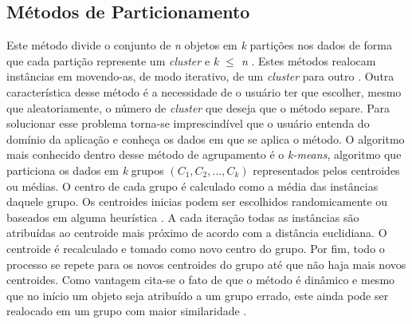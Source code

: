 \documentclass[tcc2]{classe_uftex/uftex}
\begin{document}
    \subsection{Métodos de Particionamento}
    \label{subsec:particionamento}
    Este método divide o conjunto de \emph{n} objetos em \emph{k} partições nos dados de forma que cada partição represente um \emph{cluster} e \emph{k $\leqslant$ n} \cite{2012:Han}. Estes métodos realocam instâncias em movendo-as, de modo iterativo, de um \emph{cluster} para outro \cite{2010:Maimon}. Outra característica desse método é a necessidade de o usuário ter que escolher, mesmo que aleatoriamente, o número de \emph{cluster} que deseja que o método separe. Para solucionar esse problema torna-se imprescindível que o usuário entenda do domínio da aplicação e conheça os dados em que se aplica o método. O algoritmo mais conhecido dentro desse método de agrupamento é o \emph{k-means}, algoritmo que particiona os dados em \emph{k} grupos $(C_1,C_2,...,C_k)$ representados pelos centroides ou médias. O centro de cada grupo é calculado como a média das instâncias daquele grupo. Os centroides inicias podem ser escolhidos randomicamente ou baseados em alguma heurística \cite{2010:Maimon}. A cada iteração todas as instâncias são atribuídas ao centroide mais próximo de acordo com a distância euclidiana. O centroide é recalculado e tomado como novo centro do grupo. Por fim, todo o processo se repete para os novos centroides do grupo até que não haja mais novos centroides. Como vantagem cita-se o fato de que o método é dinâmico e mesmo que no início um objeto seja atribuído a um grupo errado, este ainda pode ser realocado em um grupo com maior similaridade \cite{2007:Omran}. 
        
        
     
\end{document}

